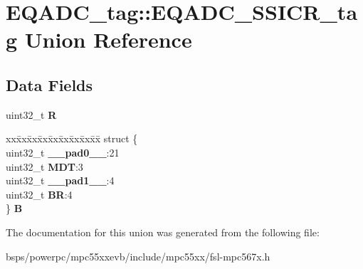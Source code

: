 \hypertarget{unionEQADC__tag_1_1EQADC__SSICR__tag}{}\section{E\+Q\+A\+D\+C\+\_\+tag\+::E\+Q\+A\+D\+C\+\_\+\+S\+S\+I\+C\+R\+\_\+tag Union Reference}
\label{unionEQADC__tag_1_1EQADC__SSICR__tag}
\subsection*{Data Fields}
\begin{DoxyCompactItemize}
\item 
\mbox{\label{unionEQADC__tag_1_1EQADC__SSICR__tag_a0425ec6ea18533fafb3b04bde09e5922}} 
uint32\+\_\+t {\bfseries R}
\item 
\mbox{\label{unionEQADC__tag_1_1EQADC__SSICR__tag_a9ba752457ea3b7df055fabd254ef73b4}} 
\begin{tabbing}
xx\=xx\=xx\=xx\=xx\=xx\=xx\=xx\=xx\=\kill
struct \{\\
\>uint32\_t {\bfseries \_\_pad0\_\_}:21\\
\>uint32\_t {\bfseries MDT}:3\\
\>uint32\_t {\bfseries \_\_pad1\_\_}:4\\
\>uint32\_t {\bfseries BR}:4\\
\} {\bfseries B}\\

\end{tabbing}\end{DoxyCompactItemize}


The documentation for this union was generated from the following file\+:\begin{DoxyCompactItemize}
\item 
bsps/powerpc/mpc55xxevb/include/mpc55xx/fsl-\/mpc567x.\+h\end{DoxyCompactItemize}
